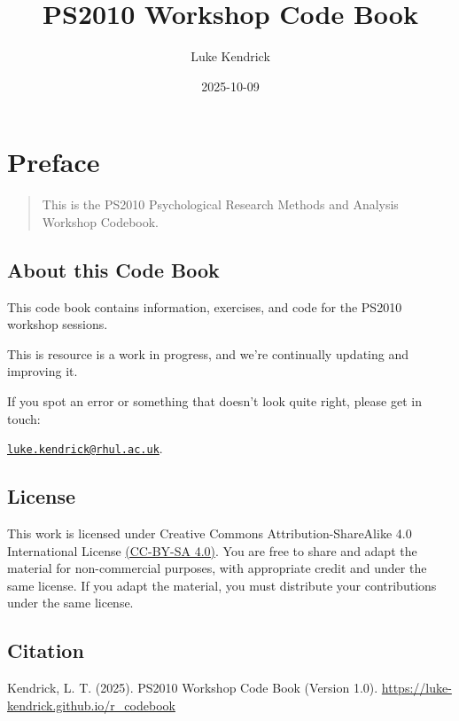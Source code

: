 \documentclass[
]{book}
\title{PS2010 Workshop Code Book}
\author{Luke Kendrick}
\date{2025-10-09}
\let\oldsection\section
\renewcommand{\section}{\needspace{5\baselineskip}\oldsection}
\begin{document}
\maketitle

{
\setcounter{tocdepth}{1}
\tableofcontents
}
\chapter*{Preface}\label{preface}

\begin{quote}
This is the PS2010 Psychological Research Methods and Analysis Workshop Codebook.
\end{quote}

\section{About this Code Book}\label{about-this-code-book}

This code book contains information, exercises, and code for the PS2010 workshop sessions.

This is resource is a work in progress, and we're continually updating and improving it.

If you spot an error or something that doesn't look quite right, please get in touch:

\href{mailto:luke.kendrick@rhul.ac.uk}{\nolinkurl{luke.kendrick@rhul.ac.uk}}.

\section{\texorpdfstring{\textbf{License}}{License}}\label{license}

This work is licensed under Creative Commons Attribution-ShareAlike 4.0 International License \href{https://creativecommons.org/licenses/by-sa/4.0/}{(CC-BY-SA 4.0)}. You are free to share and adapt the material for non-commercial purposes, with appropriate credit and under the same license. If you adapt the material, you must distribute your contributions under the same license.

\section{\texorpdfstring{\textbf{Citation}}{Citation}}\label{citation}

Kendrick, L. T. (2025). PS2010 Workshop Code Book (Version 1.0). \url{https://luke-kendrick.github.io/r_codebook}
\end{document}

